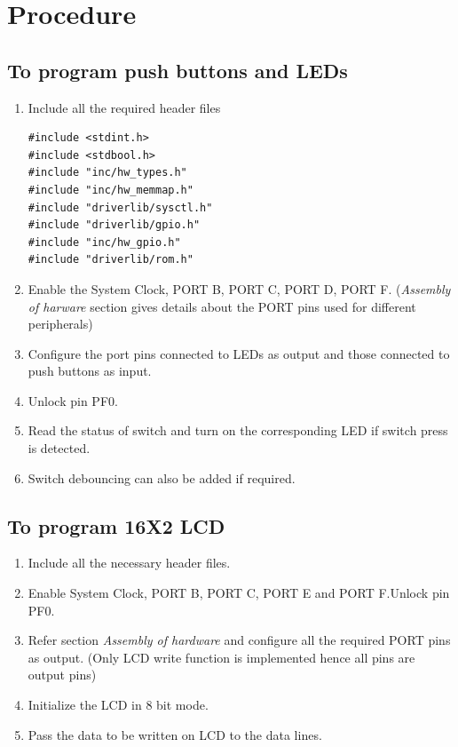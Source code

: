 \documentclass[a4paper,12pt,oneside]{book}
\begin{document}
\newpage
\section{Procedure}
\subsection{To program push buttons and LEDs}
\begin{enumerate}
\item Include all the required header files
\begin{lstlisting}
#include <stdint.h>
#include <stdbool.h>
#include "inc/hw_types.h"
#include "inc/hw_memmap.h"
#include "driverlib/sysctl.h"
#include "driverlib/gpio.h"
#include "inc/hw_gpio.h"
#include "driverlib/rom.h"
\end{lstlisting}
\item Enable the System Clock, PORT B, PORT C, PORT D, PORT F. (\textit{Assembly of harware} section gives details about the PORT pins used for different peripherals)
\item Configure the port pins connected to LEDs as output and those connected to push buttons as input.
\item Unlock pin PF0.
\item Read the status of switch and turn on the corresponding LED if switch press is detected.
\item Switch debouncing can also be added if required.
\end{enumerate}

\subsection{To program 16X2 LCD}
\begin{enumerate}
\item Include all the necessary header files.
\item Enable System Clock, PORT B, PORT C, PORT E and PORT F.Unlock pin PF0.
\item Refer section \textit{Assembly of hardware} and configure all the required PORT pins as output. (Only LCD write function is implemented hence all pins are output pins)
\item Initialize the LCD in 8 bit mode.
\item Pass the data to be written on LCD to the data lines.
\end{enumerate}
\end{document}
